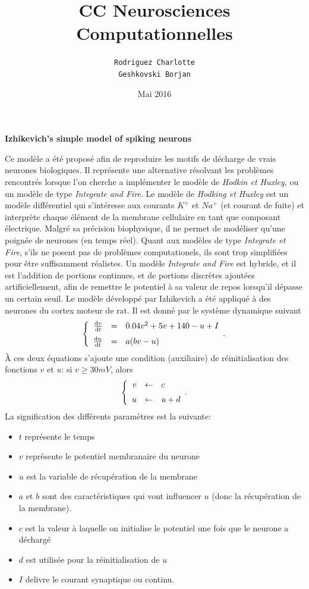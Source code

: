 \documentclass[10pt]{article}
\begin{document}
\title{CC Neurosciences Computationnelles}
\author{\texttt{Rodriguez Charlotte}\\
		\texttt{Geshkovski Borjan}}
\date{Mai 2016}
\maketitle

\begin{center}
\textbf{Izhikevich's simple model of spiking neurons}
\end{center}
\justify
Ce modèle a été proposé afin de reproduire les motifs de décharge de vrais neurones biologiques. Il représente une alternative résolvant les problèmes rencontrés lorsque l’on cherche a implémenter le modèle de \textit{Hodkin et Huxley}, ou un modèle de type \textit{Integrate and Fire}. Le modèle de \textit{Hodking et Huxley} est un modèle différentiel qui s'intéresse aux courants $K^+$ et $Na^+$ (et courant de fuite) et interprète chaque élément de la membrane cellulaire en tant que composant électrique. Malgré sa précision biophysique, il ne permet de modéliser qu’une poignée de neurones (en temps réel). Quant aux modèles de type \textit{Integrate et Fire}, s’ils ne posent pas de problèmes computationels, ils sont trop simplifiées pour être suffisamment réalistes. Un modèle \textit{Integrate and Fire} est hybride, et il est l'addition de portions continues, et de portions discrètes ajoutées artificiellement, afin de remettre le potentiel \`a sa valeur de repos lorsqu'il dépasse un certain seuil.
\justify
Le modèle développé par Izhikevich a été appliqué \`a des neurones du cortex moteur de rat. Il est donné par le système dynamique suivant
\[
\left\{
\begin{array}{r c l l}
\frac{\mathrm{d}v}{\mathrm{d}t} &=& 0.04 v^2 + 5v + 140 - u + I  \\[6 pt]
\frac{\mathrm{d}u}{\mathrm{d}t} &=& a(bv-u)\\
\end{array}.
\right.
\]
\`A ces deux équations s’ajoute une condition (auxiliaire) de réinitialisation des fonctions $v$ et $u$: si $v \geq 30mV$, alors
\[
\left\{
\begin{array}{r c l l}
v &\leftarrow& c \\[6 pt]
u &\leftarrow& u + d\\
\end{array}.
\right.
\]
La signification des différents paramètres est la suivante:
\justify
\begin{itemize}
\item $t$ représente le temps
\item $v$ représente le potentiel membranaire du neurone
\item $u$ est la variable de récupération de la membrane
\item $a$ et $b$ sont des caractéristiques qui vont influencer $u$ (donc la récupération de la membrane).
\item $c$ est la valeur \`a laquelle on initialise le potentiel une fois que le neurone a déchargé
\item $d$ est utilisée pour la réinitialisation de $u$
\item $I$ delivre le courant synaptique ou continu.
\end{itemize}	
\end{document}
